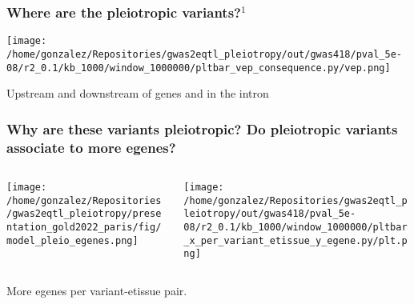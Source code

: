 \documentclass{beamer}
\begin{document}
\begin{frame}
\frametitle{Where are the pleiotropic variants?$^1$}

    \begin{center}
\texttt{[image: /home/gonzalez/Repositories/gwas2eqtl\_pleiotropy/out/gwas418/pval\_5e-08/r2\_0.1/kb\_1000/window\_1000000/pltbar\_vep\_consequence.py/vep.png]}
     \end{center}

Upstream and downstream of genes and in the intron

\let\thefootnote\relax{}
     
\end{frame}

\begin{frame}
\frametitle{Why are these variants pleiotropic? Do pleiotropic variants associate to more egenes?}

\begin{columns}
\begin{column}{0.5\textwidth}
    \begin{center}
\texttt{[image: /home/gonzalez/Repositories/gwas2eqtl\_pleiotropy/presentation\_gold2022\_paris/fig/model\_pleio\_egenes.png]}
     \end{center}
\end{column}
\begin{column}{0.5\textwidth}  %
    \begin{center}
\texttt{[image: /home/gonzalez/Repositories/gwas2eqtl\_pleiotropy/out/gwas418/pval\_5e-08/r2\_0.1/kb\_1000/window\_1000000/pltbar\_x\_per\_variant\_etissue\_y\_egene.py/plt.png]}
     \end{center}
\end{column}
\end{columns}

More egenes per variant-etissue pair.

\end{frame}
\end{document}
